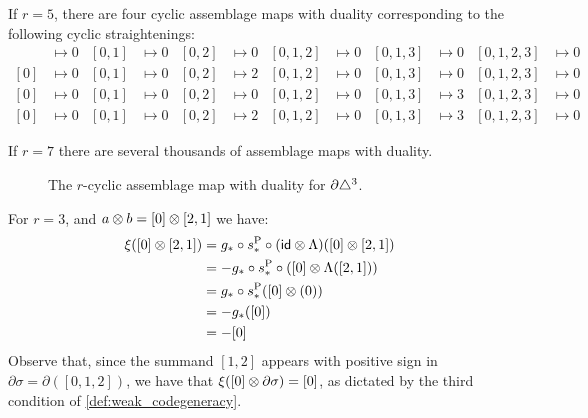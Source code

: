 \begin{example}\label{example:asymmetries5}
	If $r=5$, there are four cyclic assemblage maps with duality corresponding to the following cyclic straightenings:
	\begin{align*}
		[0]&\mapsto 0 & [0,1]&\mapsto 0 & [0,2]&\mapsto 0 & [0,1,2]&\mapsto 0 & [0,1,3] & \mapsto 0 & [0,1,2,3] & \mapsto 0 \\
		[0]&\mapsto 0 & [0,1]&\mapsto 0 & [0,2]&\mapsto 2 & [0,1,2]&\mapsto 0 & [0,1,3] & \mapsto 0 & [0,1,2,3] & \mapsto 0 \\
		[0]&\mapsto 0 & [0,1]&\mapsto 0 & [0,2]&\mapsto 0 & [0,1,2]&\mapsto 0 & [0,1,3] & \mapsto 3 & [0,1,2,3] & \mapsto 0 \\
		[0]&\mapsto 0 & [0,1]&\mapsto 0 & [0,2]&\mapsto 2 & [0,1,2]&\mapsto 0 & [0,1,3] & \mapsto 3 & [0,1,2,3] & \mapsto 0
	\end{align*}
\end{example}

If $r=7$ there are several thousands of assemblage maps with duality.

\begin{figure}
	\caption{The $r$-cyclic assemblage map with duality for $\partial \triangle^3$.}
\end{figure}

\begin{example}\label{example:f3_1}
	For $r=3$, and $a \otimes b = [0] \otimes [2,1]$ we have:
	\begin{align*}
		\xi([0] \otimes [2,1])
		&= g_*\circ s_*^{{\operatorname{P}}}\circ (\mathsf{id}\otimes \Lambda)([0] \otimes [2,1])
		\\
		&= -g_*\circ s_*^{{\operatorname{P}}}\circ ([0] \otimes \Lambda([2,1]))
		\\
		&= g_*\circ s_*^{{\operatorname{P}}}([0] \otimes (0))
		\\
		&= -g_*([0])
		\\
		&= -[0]
	\end{align*}
	Observe that, since the summand $[1,2]$ appears with positive sign in $\partial \sigma = \partial([0,1,2])$, we have that $\xi([0] \otimes \partial\sigma) = [0]$, as dictated by the third condition of \cref{def:weak_codegeneracy}.
\end{example}

